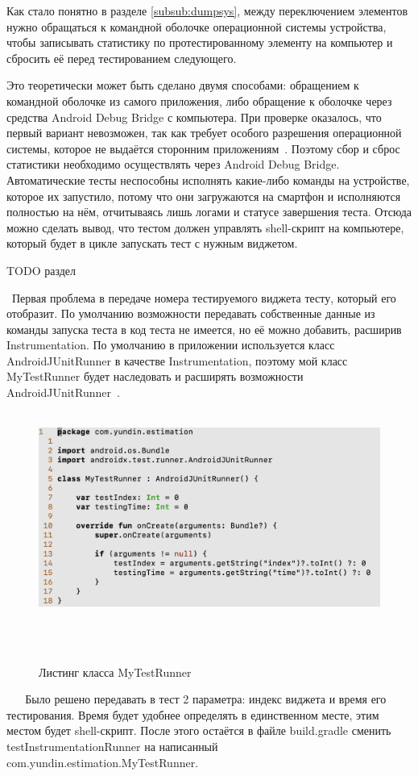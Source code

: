 \documentclass[a4paper,14pt]{extarticle} %
\begin{document}
	Как стало понятно в разделе \ref{subsub:dumpsys}, между переключением элементов нужно обращаться к командной оболочке операционной системы устройства, чтобы записывать статистику по протестированному элементу на компьютер и сбросить её перед тестированием следующего.
	
	Это теоретически может быть сделано двумя способами: обращением к командной оболочке из самого приложения, либо обращение к оболочке через средства Android Debug Bridge с компьютера. При проверке оказалось, что первый вариант невозможен, так как требует особого разрешения операционной системы, которое не выдаётся сторонним приложениям~\parencite{Dump_Permission}. Поэтому сбор и сброс статистики необходимо осуществлять через Android Debug Bridge. Автоматические тесты неспособны исполнять какие-либо команды на устройстве, которое их запустило, потому что они загружаются на смартфон и исполняются полностью на нём, отчитываясь лишь логами и статусе завершения теста. Отсюда можно сделать вывод, что тестом должен управлять shell-скрипт на компьютере, который будет в цикле запускать тест с нужным виджетом.
	
	{\huge TODO раздел}
	
	 Первая проблема в передаче номера тестируемого виджета тесту, который его отобразит. По умолчанию возможности передавать собственные данные из команды запуска теста в код теста не имеется, но её можно добавить, расширив Instrumentation. По умолчанию в приложении используется класс AndroidJUnitRunner в качестве Instrumentation, поэтому мой класс MyTestRunner будет наследовать и расширять возможности AndroidJUnitRunner~\ris{\ref{fig:mytestrunner}}.
	 
	 \begin{figure}[tbh]
	 	\includegraphics[width=\textwidth]{mytestrunner}
	 	\vspace{-0.7cm}
	 	\caption{Листинг класса MyTestRunner}
	 	\label{fig:mytestrunner}
	 \end{figure}
 
 	Было решено передавать в тест 2 параметра: индекс виджета и время его тестирования. Время будет удобнее определять в единственном месте, этим местом будет shell-скрипт. После этого остаётся в файле build.gradle сменить testInstrumentationRunner на написанный com.yundin.estimation.MyTestRunner.
	
\end{document}
